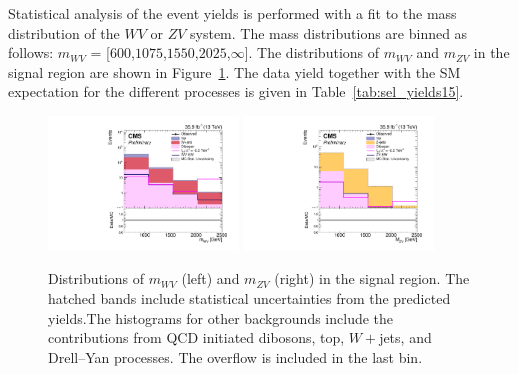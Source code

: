 Statistical analysis of the event yields is performed with a fit to the mass distribution of the $W V$ or $Z V$ system. The mass distributions are binned as follows: $m_{W V}$ = [$600$,$1075$,$1550$,$2025$,$\infty$]. The distributions of $m_{W V}$ and $m_{Z V}$ in the signal region are shown in Figure~\ref{fig:signal2}. The data yield together with the SM expectation for the different processes is given in Table~\ref{tab:sel_yields15}.


\begin{figure}[htb]
\centering
\includegraphics[width=0.45\textwidth]{Plots/plots/wv_signal.pdf}%
\includegraphics[width=0.45\textwidth]{Plots/plots/zv_signal.pdf}
\caption{Distributions of $m_{WV}$ (left) and $m_{ZV}$ (right) in
the signal region. The hatched bands include statistical uncertainties from the predicted yields.The histograms for other backgrounds include the contributions
from QCD initiated dibosons, top, $W+$jets, and Drell--Yan processes. The overflow is included in the last bin.}
\label{fig:signal2}
\end{figure}


